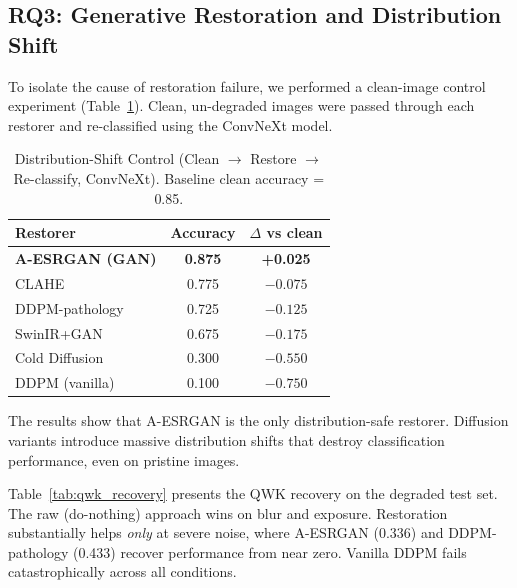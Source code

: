 \documentclass[runningheads]{llncs}
\begin{document}
\subsection{RQ3: Generative Restoration and Distribution Shift}
To isolate the cause of restoration failure, we performed a clean-image control experiment (Table~\ref{tab:dist_shift}). Clean, un-degraded images were passed through each restorer and re-classified using the ConvNeXt model.

\begin{table}[!t]
\caption{Distribution-Shift Control (Clean $\rightarrow$ Restore $\rightarrow$ Re-classify, ConvNeXt). Baseline clean accuracy = 0.85.}
\label{tab:dist_shift}
\begin{center}
\begin{tabular}{lcc}
\toprule
\textbf{Restorer} & \textbf{Accuracy} & \textbf{$\Delta$ vs clean} \\
\midrule
\textbf{A-ESRGAN (GAN)} & \textbf{0.875} & \textbf{+0.025} \\
CLAHE & 0.775 & $-0.075$ \\
DDPM-pathology & 0.725 & $-0.125$ \\
SwinIR+GAN & 0.675 & $-0.175$ \\
Cold Diffusion & 0.300 & $-0.550$ \\
DDPM (vanilla) & 0.100 & $-0.750$ \\
\bottomrule
\end{tabular}
\end{center}
\end{table}

The results show that A-ESRGAN is the only distribution-safe restorer. Diffusion variants introduce massive distribution shifts that destroy classification performance, even on pristine images.

Table~\ref{tab:qwk_recovery} presents the QWK recovery on the degraded test set. The raw (do-nothing) approach wins on blur and exposure. Restoration substantially helps \textit{only} at severe noise, where A-ESRGAN (0.336) and DDPM-pathology (0.433) recover performance from near zero. Vanilla DDPM fails catastrophically across all conditions.
\end{document}
